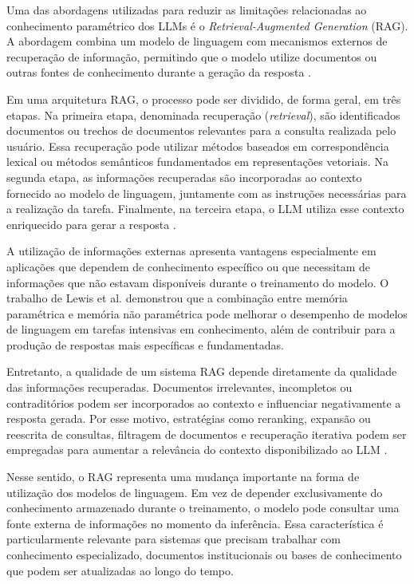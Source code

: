 Uma das abordagens utilizadas para reduzir as limitações relacionadas ao conhecimento paramétrico dos LLMs é o \textit{Retrieval-Augmented Generation} (RAG). A abordagem combina um modelo de linguagem com mecanismos externos de recuperação de informação, permitindo que o modelo utilize documentos ou outras fontes de conhecimento durante a geração da resposta \cite{lewis2020rag}.

Em uma arquitetura RAG, o processo pode ser dividido, de forma geral, em três etapas. Na primeira etapa, denominada recuperação (\textit{retrieval}), são identificados documentos ou trechos de documentos relevantes para a consulta realizada pelo usuário. Essa recuperação pode utilizar métodos baseados em correspondência lexical ou métodos semânticos fundamentados em representações vetoriais. Na segunda etapa, as informações recuperadas são incorporadas ao contexto fornecido ao modelo de linguagem, juntamente com as instruções necessárias para a realização da tarefa. Finalmente, na terceira etapa, o LLM utiliza esse contexto enriquecido para gerar a resposta \cite{zhao2023survey}.

A utilização de informações externas apresenta vantagens especialmente em aplicações que dependem de conhecimento específico ou que necessitam de informações que não estavam disponíveis durante o treinamento do modelo. O trabalho de Lewis et al. \cite{lewis2020rag} demonstrou que a combinação entre memória paramétrica e memória não paramétrica pode melhorar o desempenho de modelos de linguagem em tarefas intensivas em conhecimento, além de contribuir para a produção de respostas mais específicas e fundamentadas.

Entretanto, a qualidade de um sistema RAG depende diretamente da qualidade das informações recuperadas. Documentos irrelevantes, incompletos ou contraditórios podem ser incorporados ao contexto e influenciar negativamente a resposta gerada. Por esse motivo, estratégias como reranking, expansão ou reescrita de consultas, filtragem de documentos e recuperação iterativa podem ser empregadas para aumentar a relevância do contexto disponibilizado ao LLM \cite{zhao2023survey}.

Nesse sentido, o RAG representa uma mudança importante na forma de utilização dos modelos de linguagem. Em vez de depender exclusivamente do conhecimento armazenado durante o treinamento, o modelo pode consultar uma fonte externa de informações no momento da inferência. Essa característica é particularmente relevante para sistemas que precisam trabalhar com conhecimento especializado, documentos institucionais ou bases de conhecimento que podem ser atualizadas ao longo do tempo.

